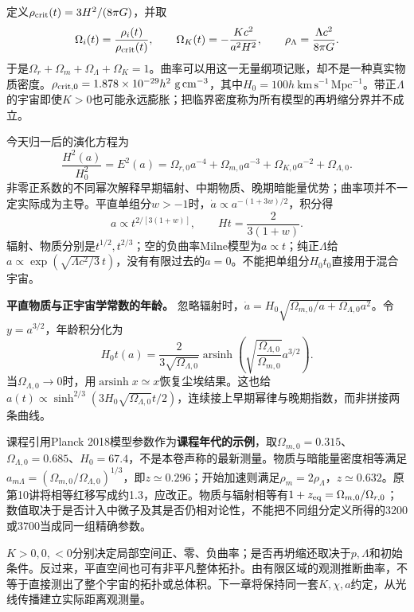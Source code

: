 定义$\rho_{\rm crit}(t)=3H^2/(8\pi G)$，并取
\[
 \Omega_i(t)=\frac{\rho_i(t)}{\rho_{\rm crit}(t)},\qquad
 \Omega_K(t)=-\frac{Kc^2}{a^2H^2},\qquad
 \rho_\Lambda=\frac{\Lambda c^2}{8\pi G}.
\]
于是$\Omega_r+\Omega_m+\Omega_\Lambda+\Omega_K=1$。曲率可以用这一无量纲项记账，却不是一种真实物质密度。$\rho_{\rm crit,0}=1.878\times10^{-29}h^2\ \mathrm{g\,cm^{-3}}$，其中$H_0=100h\ \mathrm{km\,s^{-1}\,Mpc^{-1}}$。带正$\Lambda$的宇宙即使$K>0$也可能永远膨胀；把临界密度称为所有模型的再坍缩分界并不成立。

今天归一后的演化方程为
\begin{equation}\label{eq:astro-Ea}
 \frac{H^2(a)}{H_0^2}=E^2(a)=\Omega_{r,0}a^{-4}+\Omega_{m,0}a^{-3}
 +\Omega_{K,0}a^{-2}+\Omega_{\Lambda,0}.
\end{equation}
非零正系数的不同幂次解释早期辐射、中期物质、晚期暗能量优势；曲率项并不一定实际成为主导。平直单组分$w>-1$时，$\dot a\propto a^{-(1+3w)/2}$，积分得
\[
 a\propto t^{2/[3(1+w)]},\qquad Ht=\frac{2}{3(1+w)}.
\]
辐射、物质分别是$t^{1/2},t^{2/3}$；空的负曲率Milne模型为$a\propto t$；纯正$\Lambda$给$a\propto\exp(\sqrt{\Lambda c^2/3}\,t)$，没有有限过去的$a=0$。不能把单组分$H_0t_0$直接用于混合宇宙。

\begin{example}
\textbf{平直物质与正宇宙学常数的年龄。}
忽略辐射时，$\dot a=H_0\sqrt{\Omega_{m,0}/a+\Omega_{\Lambda,0}a^2}$。令$y=a^{3/2}$，年龄积分化为
\[
 H_0t(a)=\frac{2}{3\sqrt{\Omega_{\Lambda,0}}}
 \operatorname{arsinh}\left(\sqrt{\frac{\Omega_{\Lambda,0}}{\Omega_{m,0}}}a^{3/2}\right).
\]
当$\Omega_{\Lambda,0}\to0$时，用$\operatorname{arsinh}x\simeq x$恢复尘埃结果。这也给$ a(t)\propto\sinh^{2/3}(3H_0\sqrt{\Omega_{\Lambda,0}}t/2)$，连续接上早期幂律与晚期指数，而非拼接两条曲线。
\end{example}

课程引用Planck 2018模型参数作为\textbf{课程年代的示例}，取$\Omega_{m,0}=0.315$、$\Omega_{\Lambda,0}=0.685$、$H_0=67.4$，不是本卷声称的最新测量。物质与暗能量密度相等满足$a_{m\Lambda}=(\Omega_{m,0}/\Omega_{\Lambda,0})^{1/3}$，即$z\simeq0.296$；开始加速则满足$\rho_m=2\rho_\Lambda$，$z\simeq0.632$。原第10讲将相等红移写成约1.3，应改正。物质与辐射相等有$1+z_{\rm eq}=\Omega_{m,0}/\Omega_{r,0}$；数值取决于是否计入中微子及其是否仍相对论性，不能把不同组分定义所得的3200或3700当成同一组精确参数。

$K>0,0,<0$分别决定局部空间正、零、负曲率；是否再坍缩还取决于$p,\Lambda$和初始条件。反过来，平直空间也可有非平凡整体拓扑。由有限区域的观测推断曲率，不等于直接测出了整个宇宙的拓扑或总体积。下一章将保持同一套$K,\chi,a$约定，从光线传播建立实际距离观测量。
